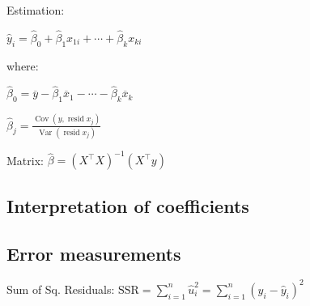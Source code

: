 \documentclass[10pt, a4paper, landscape]{article}
\DeclareMathOperator{\Var}{Var}
\DeclareMathOperator{\Cov}{Cov}
\DeclareMathOperator{\resid}{resid}
\newcommand{\SSR}{\text{SSR}}
\begin{document}
\begin{multicols}{3}
\begin{multicols}{2}
Estimation:

\begin{center}
	\( \hat{y}_{i} = \hat{\beta}_{0} + \hat{\beta}_{1} x_{1i} + \cdots + \hat{\beta}_{k} x_{ki} \)
\end{center}

where:

\begin{center}
	\( \hat{\beta}_{0} = \overline{y} - \hat{\beta}_{1} \overline{x}_{1} - \cdots - \hat{\beta}_{k} \overline{x}_{k} \)

	\( \hat{\beta}_{j} = \frac{\Cov(y, \resid x_{j})}{\Var(\resid x_{j})} \)
\end{center}

Matrix: \( \hat{\beta} = (X^{\top} X)^{-1}(X^{\top} y) \)

\end{multicols}

\subsection*{Interpretation of coefficients}

\begin{center}
\end{center}

\subsection*{Error measurements}

Sum of Sq. Residuals: \hfill \( \SSR = \sum_{i = 1}^{n} \hat{u}_{i}^{2} = \sum_{i = 1}^{n} (y_{i} - \hat{y}_{i})^{2} \)


\end{multicols}
\end{document}
